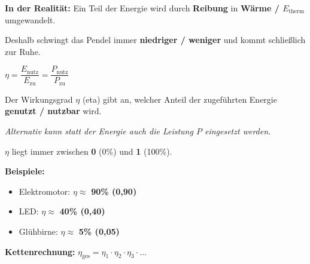 \documentclass[11pt, a4paper]{article}
\newcommand{\lsg}[1]{\textcolor{loesung}{\textbf{#1}}}
\begin{document}
\begin{merkkasten}[title={\textbf{Kasten 3: Energieflussdiagramm}}]
\begin{center}
\end{center}

\vspace{4pt}
\textbf{In der Realität:} Ein Teil der Energie wird durch \lsg{Reibung} in \lsg{Wärme / $E_\text{therm}$} umgewandelt.

Deshalb schwingt das Pendel immer \lsg{niedriger / weniger} und kommt schließlich zur Ruhe.
\end{merkkasten}

\begin{merkkasten}[title={\textbf{Kasten 4: Wirkungsgrad}}]
\begin{formelkasten}
\centering
\Large $\eta = \dfrac{E_\text{nutz}}{E_\text{zu}} = \dfrac{P_\text{nutz}}{P_\text{zu}}$
\end{formelkasten}

\vspace{4pt}
Der Wirkungsgrad $\eta$ (eta) gibt an, welcher Anteil der zugeführten Energie \lsg{genutzt / nutzbar} wird.

\textit{Alternativ kann statt der Energie auch die Leistung $P$ eingesetzt werden.}

$\eta$ liegt immer zwischen \lsg{0} (0\%) und \lsg{1} (100\%).

\vspace{6pt}
\textbf{Beispiele:}
\begin{itemize}[leftmargin=1.5em, itemsep=2pt]
\item Elektromotor: $\eta \approx$ \lsg{90\% (0,90)}
\item LED: $\eta \approx$ \lsg{40\% (0,40)}
\item Glühbirne: $\eta \approx$ \lsg{5\% (0,05)}
\end{itemize}

\vspace{4pt}
\textbf{Kettenrechnung:} $\eta_\text{ges} = \eta_1 \cdot \eta_2 \cdot \eta_3 \cdot \ldots$
\end{merkkasten}
\end{document}
